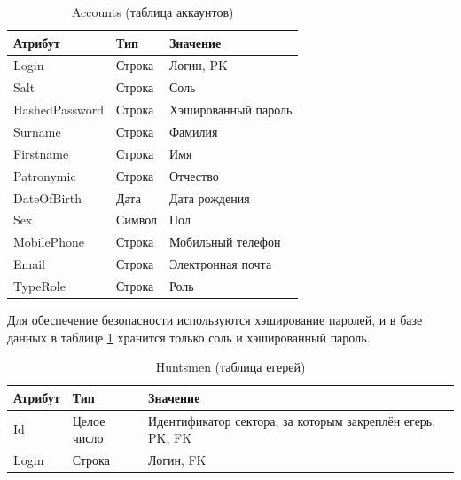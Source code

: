 	\begin{table}[pt!]
		\begin{center}
			\caption{Accounts (таблица аккаунтов)}
			\label{acc_table}
			\begin{tabular}{| p{3cm} | p{3cm} | p{8cm} |}
				\hline
				\textbf{Атрибут} 	& \textbf{Тип} & \textbf{Значение} \\
				\hline
				Login 				& Строка &	Логин, PK \\ 
				\hline
				Salt 				& Строка &	Соль  \\ 
				\hline
				HashedPassword 		& Строка &	Хэшированный пароль \\ 
				\hline
				Surname 			& Строка &	Фамилия \\ 
				\hline
				Firstname 			& Строка &	Имя \\ 
				\hline
				Patronymic 			& Строка &	Отчество \\ 
				\hline
				DateOfBirth 		& Дата &	Дата рождения \\ 
				\hline
				Sex 				& Символ &	Пол \\ 
				\hline
				MobilePhone 		& Строка &	Мобильный телефон \\ 
				\hline
				Email 				& Строка &	Электронная почта \\ 
				\hline
				TypeRole 			& Строка &	Роль \\ 
				\hline
			\end{tabular}
		\end{center}
	\end{table}

	Для обеспечение безопасности используются хэширование паролей, и в базе данных в таблице \ref{acc_table} хранится только соль и хэшированный пароль.\\

	\begin{table}[pt!] 
		\begin{center}
			\caption{Huntsmen (таблица егерей)}
			\label{huntsmen_table}
			\begin{tabular}{| p{3cm} | p{3cm} | p{8cm} |}
				\hline
				\textbf{Атрибут} 	& \textbf{Тип} & \textbf{Значение} \\
				\hline
				Id 					& Целое число &	Идентификатор сектора, за которым закреплён егерь, PK, FK \\
				\hline
				Login	 			& Строка &	Логин, FK \\ 
				\hline
			\end{tabular}
		\end{center}
	\end{table}

